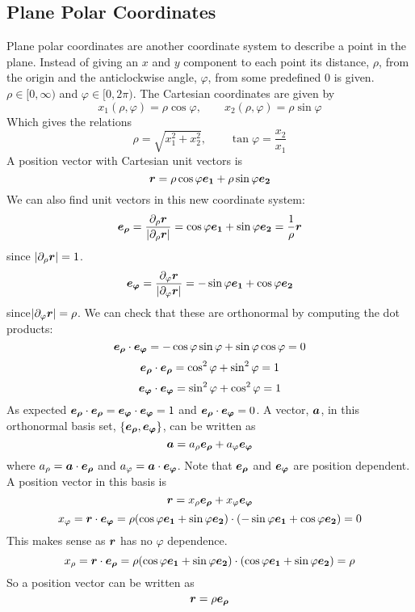 \documentclass{article}
\begin{document}
    \subsection{Plane Polar Coordinates}
    Plane polar coordinates are another coordinate system to describe a point in the plane.
    Instead of giving an \(x\) and \(y\) component to each point its distance, \(\rho\), from the origin and the anticlockwise angle, \(\varphi\), from some predefined 0 is given.
    \(\rho\in[0, \infty)\) and \(\varphi\in[0, 2\pi)\).
    The Cartesian coordinates are given by
    \[x_1(\rho, \varphi) = \rho\cos\varphi,\qquad x_2(\rho, \varphi) = \rho\sin\varphi\]
    Which gives the relations
    \[\rho = \sqrt{x_1^2 + x_2^2},\qquad \tan\varphi = \frac{x_2}{x_1}\]
    A position vector with Cartesian unit vectors is
    \[\bm{r} = \rho\cos\varphi \bm{e_{1}} + \rho\sin\varphi \bm{e_{2}}\]
    We can also find unit vectors in this new coordinate system:
    \[\bm{e_{\rho}} = \frac{\partial_\rho\bm{r}}{|\partial_\rho\bm{r}|} = \cos\varphi\bm{e_{1}} + \sin\varphi\bm{e_{2}} = \frac{1}{\rho}\bm{r}\]
    since \(|\partial_\rho\bm{r}| = 1\).
    \[\bm{e_{\varphi}} = \frac{\partial_\varphi\bm{r}}{|\partial_\varphi\bm{r}|} = -\sin\varphi\bm{e_{1}} + \cos\varphi\bm{e_{2}}\]
    since\(|\partial_\varphi\bm{r}| = \rho\).
    We can check that these are orthonormal by computing the dot products:
    \[\bm{e_{\rho}} \cdot\bm{e_{\varphi}} = -\cos\varphi\sin\varphi + \sin\varphi\cos\varphi = 0\]
    \[\bm{e_{\rho}}\cdot\bm{e_{\rho}} = \cos^2\varphi + \sin^2\varphi = 1\]
    \[\bm{e_{\varphi}}\cdot\bm{e_{\varphi}} = \sin^2\varphi + \cos^2\varphi = 1\]
    As expected \(\bm{e_{\rho}}\cdot\bm{e_{\rho}} = \bm{e_{\varphi}}\cdot\bm{e_{\varphi}} = 1\) and \(\bm{e_{\rho}}\cdot\bm{e_{\varphi}} = 0\).
    A vector, \(\bm{a}\), in this orthonormal basis set, \(\{\bm{e_{\rho}}, \bm{e_{\varphi}}\}\), can be written as
    \[\bm{a} = a_\rho\bm{e_{\rho}} + a_\varphi\bm{e_{\varphi}}\]
    where \(a_\rho = \bm{a}\cdot\bm{e_{\rho}}\) and \(a_\varphi = \bm{a}\cdot\bm{e_{\varphi}}\).
    Note that \(\bm{e_{\rho}}\) and \(\bm{e_{\varphi}}\) are position dependent.
    A position vector in this basis is
    \[\bm{r} = x_\rho\bm{e_{\rho}} + x_\varphi\bm{e_{\varphi}}\]
    \[x_\varphi = \bm{r}\cdot \bm{e_{\varphi}} = \rho(\cos\varphi\bm{e_{1}} + \sin\varphi\bm{e_{2}})\cdot(-\sin\varphi\bm{e_{1}} + \cos\varphi\bm{e_{2}}) = 0\]
    This makes sense as \(\bm{r}\) has no \(\varphi\) dependence.
    \[x_\rho = \bm{r}\cdot\bm{e_{\rho}} = \rho(\cos\varphi\bm{e_{1}} + \sin\varphi\bm{e_{2}})\cdot(\cos\varphi\bm{e_{1}} + \sin\varphi\bm{e_{2}}) = \rho\]
    So a position vector can be written as
    \[\bm{r} = \rho\bm{e_{\rho}}\]
    
\end{document}
